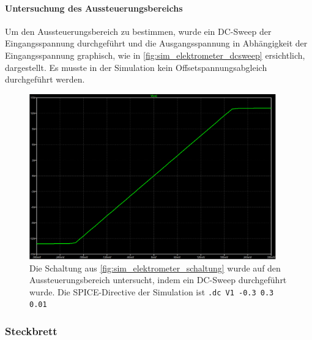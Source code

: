 \documentclass[12pt,english,ngerman]{scrartcl}
\begin{document}
\paragraph{Untersuchung des Aussteuerungsbereichs} \label{sec:mess_aussteuerungsbereich}

Um den Aussteuerungsbereich zu bestimmen, wurde ein DC-Sweep der
Eingangsspannung durchgeführt und die Ausgangsspannung in Abhängigkeit der
Eingangsspannung graphisch, wie in \autoref{fig:sim_elektrometer_dcsweep}
ersichtlich, dargestellt. Es musste in der Simulation kein
Offsetspannungsabgleich durchgeführt werden.

\begin{figure}[H]
  \centering
    \includegraphics[width=0.95\textwidth]{./figures/elektrometer/sim/aus_sweep.png}
  \caption{Die Schaltung aus \autoref{fig:sim_elektrometer_schaltung} wurde auf
  den Aussteuerungsbereich untersucht, indem ein DC-Sweep durchgeführt wurde. Die
  SPICE-Directive der Simulation ist \texttt{.dc V1 -0.3 0.3 0.01}}
  \label{fig:sim_elektrometer_dcsweep}
\end{figure}

\subsubsection{Steckbrett} \label{sec:elektrometer_steckbrett}
\end{document}
